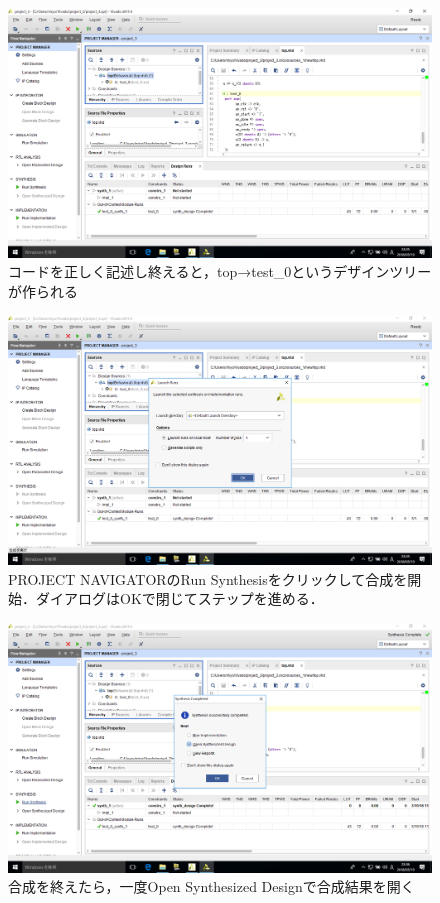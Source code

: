 \documentclass[a4paper,dvipdfmx]{jsarticle}
\begin{document}
 \begin{figure}[H]
  \begin{center}
   \includegraphics[width=.8\textwidth]{chapter08_figures/VirtualBox_Windows10_19_03_2018_23_35_01.png}
  \end{center}
  \caption{コードを正しく記述し終えると，top→test\_0というデザインツリーが作られる}
 \end{figure}

 \begin{figure}[H]
  \begin{center}
   \includegraphics[width=.8\textwidth]{chapter08_figures/VirtualBox_Windows10_19_03_2018_23_35_12.png}
  \end{center}
  \caption{PROJECT NAVIGATORのRun Synthesisをクリックして合成を開始．ダイアログはOKで閉じてステップを進める．}
 \end{figure}

 \begin{figure}[H]
  \begin{center}
   \includegraphics[width=.8\textwidth]{chapter08_figures/VirtualBox_Windows10_19_03_2018_23_36_43.png}
  \end{center}
  \caption{合成を終えたら，一度Open Synthesized Designで合成結果を開く}
 \end{figure}
\end{document}
